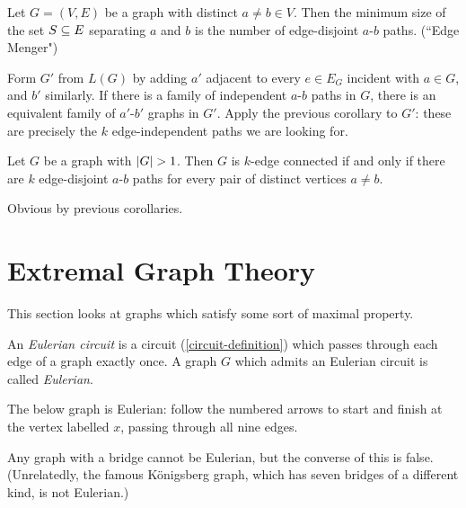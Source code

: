 \documentclass{article}
\begin{document}
\begin{corollary}
	Let $G = (V, E)$ be a graph with distinct $a \neq b \in V$. Then the minimum size of the set $S \subseteq E$ separating $a$ and $b$ is the number of edge-disjoint $a$-$b$ paths. (``Edge Menger")
\end{corollary}

\begin{prf}
	Form $G'$ from $L(G)$ by adding $a'$ adjacent to every $e \in E_G$ incident with $a \in G$, and $b'$ similarly. If there is a family of independent $a$-$b$ paths in $G$, there is an equivalent family of $a'$-$b'$ graphs in $G'$. Apply the previous corollary to $G'$: these are precisely the $k$ edge-independent paths we are looking for.
\end{prf}

\begin{corollary}
    Let $G$ be a graph with $\left\lvert G \right\rvert > 1$. Then $G$ is $k$-edge connected if and only if there are $k$ edge-disjoint $a$-$b$ paths for every pair of distinct vertices $a \neq b$.
\end{corollary}

\begin{prf}
    Obvious by previous corollaries.
\end{prf}


\pagebreak
\section{Extremal Graph Theory}

This section looks at graphs which satisfy some sort of maximal property.

\begin{definition}
    An \textit{Eulerian circuit} is a circuit (\ref{circuit-definition}) which passes through each edge of a graph exactly once. A graph $G$ which admits an Eulerian circuit is called \textit{Eulerian}.
\end{definition}

\begin{example}
    \label{eulerian}
    The below graph is Eulerian: follow the numbered arrows to start and finish at the vertex labelled $x$, passing through all nine edges.
    
    
    Any graph with a bridge cannot be Eulerian, but the converse of this is false. (Unrelatedly, the famous K{\" o}nigsberg graph, which has seven bridges of a different kind, is not Eulerian.)
\end{example}
\end{document}

